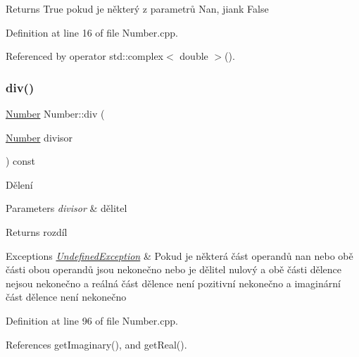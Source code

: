\begin{DoxyReturn}{Returns}
True pokud je některý z parametrů Nan, jiank False 
\end{DoxyReturn}


Definition at line 16 of file Number.\+cpp.



Referenced by operator std\+::complex$<$ double $>$().

\mbox{\label{classteam22_1_1_math_1_1_number_a169aafbe3a08bcc9d0f8f07bee388516}} 
\subsubsection{\texorpdfstring{div()}{div()}}
{\footnotesize\ttfamily \hyperlink{classteam22_1_1_math_1_1_number}{Number} Number\+::div (\begin{DoxyParamCaption}\item[{\hyperlink{classteam22_1_1_math_1_1_number}{Number}}]{divisor }\end{DoxyParamCaption}) const}



Dělení 


\begin{DoxyParams}{Parameters}
{\em divisor} & dělitel \\
\hline
\end{DoxyParams}
\begin{DoxyReturn}{Returns}
rozdíl 
\end{DoxyReturn}

\begin{DoxyExceptions}{Exceptions}
{\em \hyperlink{classteam22_1_1_math_1_1_undefined_exception}{Undefined\+Exception}} & Pokud je některá část operandů nan nebo obě části obou operandů jsou nekonečno nebo je dělitel nulový a obě části dělence nejsou nekonečno a reálná část dělence není pozitivní nekonečno a imaginární část dělence není nekonečno \\
\hline
\end{DoxyExceptions}


Definition at line 96 of file Number.\+cpp.



References get\+Imaginary(), and get\+Real().



